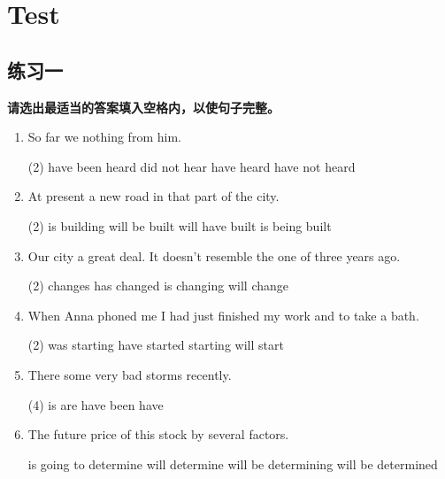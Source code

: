 \section{Test}

\subsection{练习一}

\textbf{请选出最适当的答案填入空格内，以使句子完整。}

\begin{enumerate}
\item So far we \ttu nothing from him.
  \begin{tasks}(2)
    \task have been heard
    \task did not hear
    \task have heard
    \task have not heard
  \end{tasks}


\item At present a new road \ttu in that part of the city.
  \begin{tasks}(2)
    \task is building
    \task will be built
    \task will have built
    \task is being built
  \end{tasks}

\item Our city \ttu a great deal. It doesn't resemble the one of three years ago.
  \begin{tasks}(2)
    \task changes
    \task has changed
    \task is changing
    \task will change
  \end{tasks}

\item When Anna phoned me I had just finished my work and \ttu to take a bath.
  \begin{tasks}(2)
    \task was starting
    \task have started
    \task starting
    \task will start
  \end{tasks}

\item There \ttu some very bad storms recently.
  \begin{tasks}(4)
    \task is
    \task are
    \task have been
    \task have
  \end{tasks}

\item  The future price of this stock \ttu by several factors.
  \begin{tasks}
    \task is going to determine
    \task will determine
    \task will be determining
    \task will be determined
  \end{tasks}


\end{enumerate}
